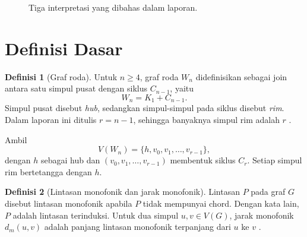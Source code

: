 \documentclass[12pt,a4paper]{article}
\theoremstyle{definition}
\newtheorem{definisi}{Definisi}
\begin{document}
\begin{figure}[h]
  \centering
  \caption{Tiga interpretasi yang dibahas dalam laporan.}
  \label{fig:interpretasi}
\end{figure}

\section{Definisi Dasar}

\begin{definisi}[Graf roda]
  Untuk $n\ge 4$, graf roda $W_n$ didefinisikan sebagai join antara satu simpul pusat dengan siklus $C_{n-1}$, yaitu
  \[
    W_n=K_1+C_{n-1}.
  \]
  Simpul pusat disebut \emph{hub}, sedangkan simpul-simpul pada siklus disebut \emph{rim}. Dalam laporan ini ditulis $r=n-1$, sehingga banyaknya simpul rim adalah $r$ \citep{mathworldWheel,li2020steiner}.
\end{definisi}

Ambil
\[
  V(W_n)=\{h,v_0,v_1,\ldots,v_{r-1}\},
\]
dengan $h$ sebagai hub dan $(v_0,v_1,\ldots,v_{r-1})$ membentuk siklus $C_r$. Setiap simpul rim bertetangga dengan $h$.

\begin{definisi}[Lintasan monofonik dan jarak monofonik]
  Lintasan $P$ pada graf $G$ disebut lintasan monofonik apabila $P$ tidak mempunyai chord. Dengan kata lain, $P$ adalah lintasan terinduksi. Untuk dua simpul $u,v\in V(G)$, jarak monofonik $d_m(u,v)$ adalah panjang lintasan monofonik terpanjang dari $u$ ke $v$ \citep{titus2017monophonic}.
\end{definisi}
\end{document}
